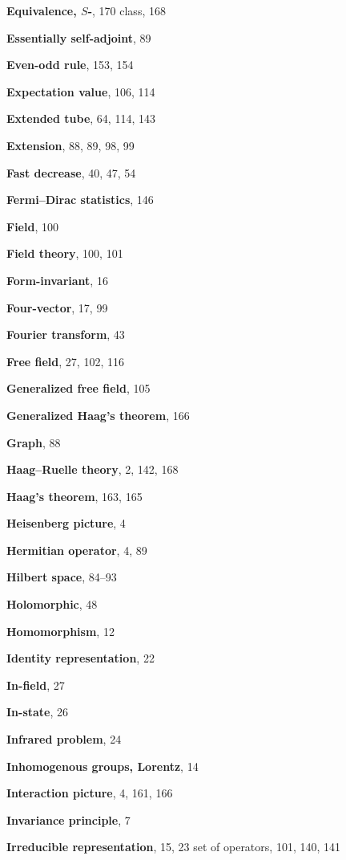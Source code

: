 \begin{theindex}
\item \textbf{Equivalence, $S$-}, 170
\subitem class, 168
\item \textbf{Essentially self-adjoint}, 89
\item \textbf{Even-odd rule}, 153, 154
\item \textbf{Expectation value}, 106, 114
\item \textbf{Extended tube}, 64, 114, 143
\item \textbf{Extension}, 88, 89, 98, 99

\indexspace
\item \textbf{Fast decrease}, 40, 47, 54
\item \textbf{Fermi--Dirac statistics}, 146
\item \textbf{Field}, 100
\item \textbf{Field theory}, 100, 101
\item \textbf{Form-invariant}, 16
\item \textbf{Four-vector}, 17, 99
\item \textbf{Fourier transform}, 43
\item \textbf{Free field}, 27, 102, 116

\indexspace
\item \textbf{Generalized free field}, 105
\item \textbf{Generalized Haag's theorem}, 166
\item \textbf{Graph}, 88

\indexspace
\item \textbf{Haag--Ruelle theory}, 2, 142, 168
\item \textbf{Haag's theorem}, 163, 165
\item \textbf{Heisenberg picture}, 4
\item \textbf{Hermitian operator}, 4, 89
\item \textbf{Hilbert space}, 84--93
\item \textbf{Holomorphic}, 48
\item \textbf{Homomorphism}, 12

\indexspace
\item \textbf{Identity representation}, 22
\item \textbf{In-field}, 27
\item \textbf{In-state}, 26
\item \textbf{Infrared problem}, 24
\item \textbf{Inhomogenous groups, Lorentz}, 14
\item \textbf{Interaction picture}, 4, 161, 166
\item \textbf{Invariance principle}, 7
\item \textbf{Irreducible representation}, 15, 23
\subitem set of operators, 101, 140, 141


\end{theindex}
